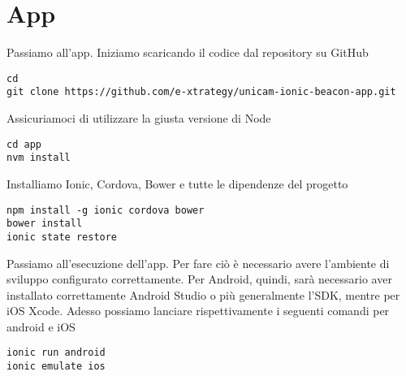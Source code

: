 \section{App}
Passiamo all'app.
Iniziamo scaricando il codice dal repository su GitHub
\begin{lstlisting}[style=JavaScriptCode]
cd
git clone https://github.com/e-xtrategy/unicam-ionic-beacon-app.git
\end{lstlisting}
Assicuriamoci di utilizzare la giusta versione di Node
\begin{lstlisting}[style=JavaScriptCode]
cd app
nvm install
\end{lstlisting} 
Installiamo Ionic, Cordova, Bower e tutte le dipendenze del progetto
\begin{lstlisting}[style=JavaScriptCode]
npm install -g ionic cordova bower
bower install
ionic state restore
\end{lstlisting}
Passiamo all'esecuzione dell'app.
Per fare ciò è necessario avere l'ambiente di sviluppo configurato correttamente. 
Per Android, quindi, sarà necessario aver installato correttamente Android Studio o più generalmente l'SDK, mentre per iOS Xcode.
Adesso possiamo lanciare rispettivamente i seguenti comandi per android e iOS
\begin{lstlisting}[style=JavaScriptCode]
ionic run android
ionic emulate ios
\end{lstlisting}  

